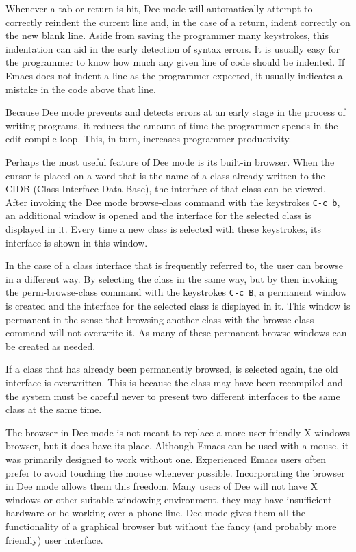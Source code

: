 Whenever a tab or return is hit, Dee mode will automatically attempt
to correctly reindent the current line and, in the case of a return,
indent correctly on the new blank line.  Aside from saving the
programmer many keystrokes, this indentation can aid in the early
detection of syntax errors.  It is usually easy for the programmer to
know how much any given line of code should be indented.  If Emacs
does not indent a line as the programmer expected, it usually
indicates a mistake in the code above that line.

Because Dee mode prevents and detects errors at an early stage in the
process of writing programs, it reduces the amount of time the
programmer spends in the edit-compile loop.  This, in turn, increases
programmer productivity.

Perhaps the most useful feature of Dee mode is its built-in browser.
When the cursor is placed on a word that is the name of a class
already written to the CIDB (Class Interface Data Base), the interface
of that class can be viewed.  After invoking the Dee mode browse-class
command with the keystrokes {\tt C-c b}, an additional window is opened and
the interface for the selected class is displayed in it.  Every time a
new class is selected with these keystrokes, its interface is shown in
this window.

In the case of a class interface that is frequently referred to, the
user can browse in a different way.  By selecting the class in the same
way, but by then invoking the perm-browse-class command with the
keystrokes {\tt C-c B}, a permanent window is created and the interface for
the selected class is displayed in it.  This window is permanent in
the sense that browsing another class with the browse-class command
will not overwrite it.  As many of these permanent browse windows can
be created as needed.

If a class that has already been permanently browsed, is selected
again, the old interface is overwritten.  This is because the class
may have been recompiled and the system must be careful never to
present two different interfaces to the same class at the same time.

The browser in Dee mode is not meant to replace a more user friendly X
windows browser, but it does have its place.  Although Emacs can be
used with a mouse, it was primarily designed to work without one.
Experienced Emacs users often prefer to avoid touching the mouse
whenever possible.  Incorporating the browser in Dee mode allows them
this freedom.  Many users of Dee will not have X windows or other
suitable windowing environment, they may have insufficient hardware or
be working over a phone line.  Dee mode gives them all the
functionality of a graphical browser but without the fancy (and
probably more friendly) user interface.

